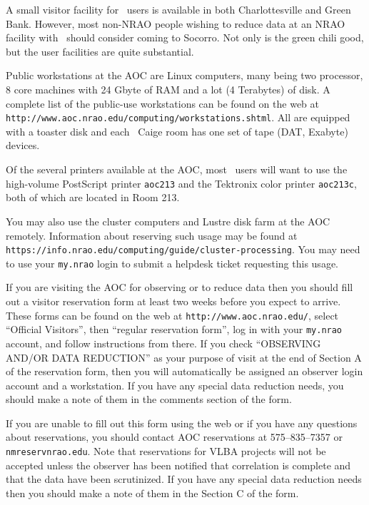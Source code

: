 
     A small visitor facility for \AIPS\ users is available in both
Charlottesville and Green Bank.  However, most non-NRAO people wishing
to reduce data at an NRAO facility with \AIPS\ should consider coming
to Socorro.  Not only is the green chili good, but the user facilities
are quite substantial.

    Public workstations at the AOC are Linux computers, many being two
processor, 8 core machines with 24 Gbyte of RAM and a lot (4
Terabytes) of disk.  A complete list of the public-use workstations
can be found on the web at {\tt
http://www.aoc.nrao.edu/computing/workstations.shtml}.  All are
equipped with a toaster disk and each \AIPS\ Caige room has one set of
tape (DAT, Exabyte) devices.

    Of the several printers available at the AOC, most \AIPS\ users
will want to use the high-volume PostScript printer {\tt aoc213} and
the Tektronix color printer {\tt aoc213c}, both of which are located
in Room 213.

    You may also use the cluster computers and Lustre disk farm at the
AOC remotely.  Information about reserving such usage may be found at
{\tt https://info.nrao.edu/computing/guide/cluster-processing}.  You
may need to use your {\tt my.nrao} login to submit a helpdesk ticket
requesting this usage.


    If you are visiting the AOC for observing or to reduce data then
you should fill out a visitor reservation form at least two weeks
before you expect to arrive. These forms can be found on the web at
{\tt http://www.aoc.nrao.edu/}, select ``Official Visitors'', then
``regular reservation form'', log in with your {\tt my.nrao} account,
and follow instructions from there.  If you check ``OBSERVING AND/OR
DATA REDUCTION'' as your purpose of visit at the end of Section A of
the reservation form, then you will automatically be assigned an
observer login account and a workstation.  If you have any special
data reduction needs, you should make a note of them in the comments
section of the form.

    If you are unable to fill out this form using the web or if you
have any questions about reservations, you should contact AOC
reservations at 575--835--7357 or {\tt nmreserv\@ nrao.edu}.  Note
that reservations for VLBA projects will not be accepted unless the
observer has been notified that correlation is complete and that the
data have been scrutinized.  If you have any special data reduction
needs then you should make a note of them in the Section C of the
form.

